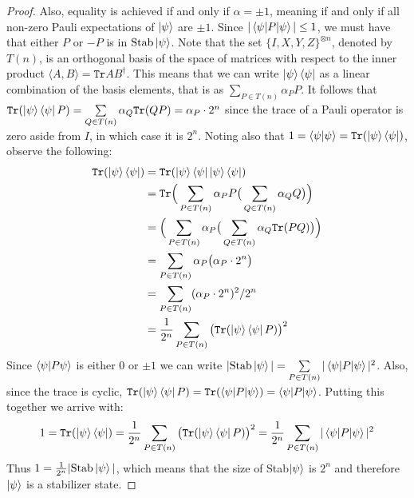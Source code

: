 \documentclass[12pt]{dalthesis}
\begin{document}
\begin{proof}
Also, equality is achieved if and only if $\alpha = \pm 1$,  meaning if and only if all non-zero Pauli expectations of $\ket{\psi}$ are $\pm 1$. Since $|\braket{\psi |P| \psi}| \leq 1$, we must have that either $P$ or $-P$ is in $\mathrm{Stab}\ket{\psi}$. Note that the set $\{ I, X, Y, Z \}^{\otimes n}$, denoted by $T(n)$, is an orthogonal basis of the space of matrices with respect to the inner product $\langle A, B \rangle = \texttt{Tr} AB^{\dag}$. This means that we can write $\ket{\psi} \bra{\psi}$ as a linear combination of the basis elements, that is as $\sum\limits_{P\in T(n)} \alpha_PP $. It follows that $\texttt{Tr}(\ket{\psi}\bra{\psi}P) = \sum\limits_{Q\in T(n)} \alpha_Q \texttt{Tr}(QP) = \alpha_P \cdot 2^n$ since the trace of a Pauli operator is zero aside from $I$, in which case it is $2^n$. Noting also that $1 = \braket{\psi |\psi} = \texttt{Tr}(\ket{\psi}\bra{\psi})$, observe the following:
\begin{equation}
\begin{split}
\texttt{Tr}(\ket{\psi}\bra{\psi}) & = \texttt{Tr}(\ket{\psi}\bra{\psi}\ket{\psi}\bra{\psi}) \\
& = \texttt{Tr} \Big( \sum\limits_{P\in T(n)} \alpha_PP \big( \sum\limits_{Q\in T(n)} \alpha_QQ \big) \Big) \\
& =  \Big( \sum\limits_{P\in T(n)} \alpha_P \big( \sum\limits_{Q\in T(n)} \alpha_Q \texttt{Tr}(PQ) \big) \Big) \\
& = \sum\limits_{P\in T(n)} \alpha_P \big( \alpha_P \cdot 2^n \big) \\
& = \sum\limits_{P\in T(n)} (\alpha_P \cdot 2^n)^2/2^n \\
& = \frac{1}{2^n} \sum\limits_{P\in T(n)} \big( \texttt{Tr}(\ket{\psi}\bra{\psi}P) \big)^2
\end{split}
\end{equation}
Since $\braket{\psi | P \psi}$ is either $0$ or $\pm 1$ we can write $|\mathrm{Stab}\ket{\psi}| = \sum\limits_{P\in T(n)} |\braket{\psi |P|\psi}|^2$. Also, since the trace is cyclic, $\texttt{Tr}(\ket{\psi}\bra{\psi}P) = \texttt{Tr}(\braket{\psi | P | \psi}) = \braket{\psi | P | \psi}$. Putting this together we arrive with:
\[
1 = \texttt{Tr}(\ket{\psi}\bra{\psi}) = \frac{1}{2^n} \sum\limits_{P\in T(n)} \big( \texttt{Tr}(\ket{\psi}\bra{\psi}P) \big)^2 = \frac{1}{2^n} \sum\limits_{P\in T(n)} |\braket{\psi |P|\psi}|^2 
\]
Thus $1 = \frac{1}{2^n} |\mathrm{Stab}\ket{\psi}|$, which means that the size of Stab$\ket{\psi}$ is $2^n$ and therefore $\ket{\psi}$ is a stabilizer state.
\end{proof}
\end{document}
